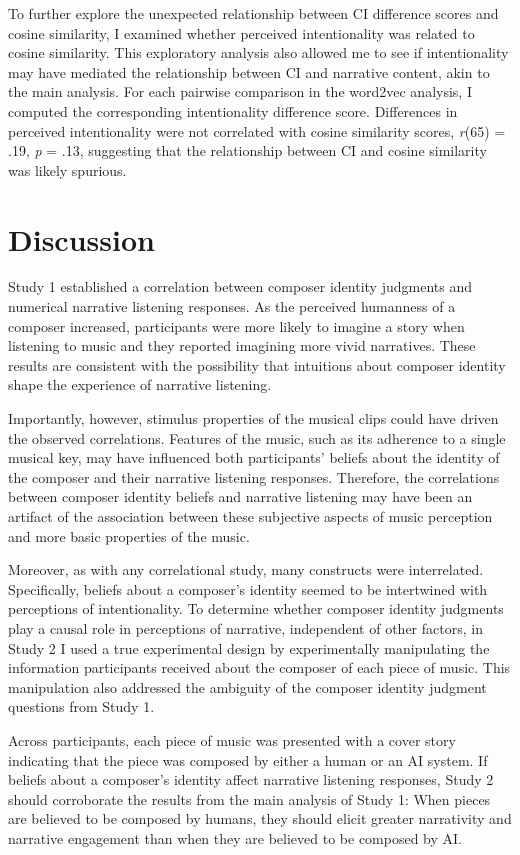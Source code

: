 \documentclass[12pt,twoside]{reedthesis}
\begin{document}
To further explore the unexpected relationship between CI difference scores and cosine similarity, I examined whether perceived intentionality was related to cosine similarity. This exploratory analysis also allowed me to see if intentionality may have mediated the relationship between CI and narrative content, akin to the main analysis. For each pairwise comparison in the word2vec analysis, I computed the corresponding intentionality difference score. Differences in perceived intentionality were not correlated with cosine similarity scores, \emph{r}(65) = .19, \emph{p} = .13, suggesting that the relationship between CI and cosine similarity was likely spurious.

\section{Discussion}


Study 1 established a correlation between composer identity judgments and numerical narrative listening responses. As the perceived humanness of a composer increased, participants were more likely to imagine a story when listening to music and they reported imagining more vivid narratives. These results are consistent with the possibility that intuitions about composer identity shape the experience of narrative listening.

Importantly, however, stimulus properties of the musical clips could have driven the observed correlations. Features of the music, such as its adherence to a single musical key, may have influenced both participants’ beliefs about the identity of the composer and their narrative listening responses. Therefore, the correlations between composer identity beliefs and narrative listening may have been an artifact of the association between these subjective aspects of music perception and more basic properties of the music.

Moreover, as with any correlational study, many constructs were interrelated. Specifically, beliefs about a composer’s identity seemed to be intertwined with perceptions of intentionality. To determine whether composer identity judgments play a causal role in perceptions of narrative, independent of other factors, in Study 2 I used a true experimental design by experimentally manipulating the information participants received about the composer of each piece of music. This manipulation also addressed the ambiguity of the composer identity judgment questions from Study 1. 

Across participants, each piece of music was presented with a cover story indicating that the piece was composed by either a human or an AI system. If beliefs about a composer’s identity affect narrative listening responses, Study 2 should corroborate the results from the main analysis of Study 1: When pieces are believed to be composed by humans, they should elicit greater narrativity and narrative engagement than when they are believed to be composed by AI. 
\end{document}
